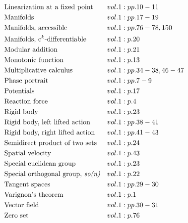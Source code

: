 \documentclass[a4paper]{article}
\begin{document}
\begin{align*}
&\text{Linearization at a fixed point}&& vol. 1: pp. 10-11\\
&\text{Manifolds}&& vol. 1: pp. 17-19\\
&\text{Manifolds, accessible}&& vol. 1: pp. 76-78, 150\\
&\text{Manifolds, c$^k$-differentiable}&& vol. 1: p. 20\\
&\text{Modular addition}&& vol. 1: p. 21\\
&\text{Monotonic function}&& vol. 1: p. 13\\
&\text{Multiplicative calculus}&& vol. 1: pp. 34-38, 46-47\\
&\text{Phase portrait}&& vol. 1: pp. 7-9\\
&\text{Potentials}&& vol. 1: p. 17\\
&\text{Reaction force}&& vol. 1: p. 4\\
&\text{Rigid body}&& vol. 1: p. 23\\
&\text{Rigid body, left lifted action}&& vol. 1: pp. 38-41\\
&\text{Rigid body, right lifted action}&& vol. 1: pp. 41-43\\
&\text{Semidirect product of two sets}&& vol. 1: p. 24\\
&\text{Spatial velocity}&& vol. 1: p. 43\\
&\text{Special euclidean group}&& vol. 1: p. 23\\
&\text{Special orthogonal group, \emph{so(n)}}&& vol. 1: p. 22\\
&\text{Tangent spaces}&& vol. 1: pp. 29-30\\
&\text{Varignon's theorem}&& vol. 1: p. 1\\
&\text{Vector field}&& vol. 1: pp. 30-31\\
&\text{Zero set}&& vol. 1: p. 76\\
\end{align*} 
\end{document}
